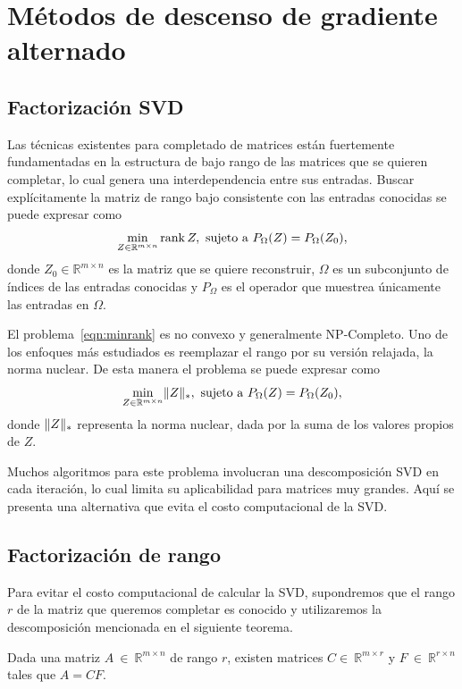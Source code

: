 \section{Métodos de descenso de gradiente alternado}

\subsection{Factorización SVD}
Las técnicas existentes para completado de matrices están fuertemente fundamentadas en la estructura de bajo rango de las matrices que se quieren completar, lo cual genera una interdependencia entre sus entradas. Buscar explícitamente la matriz de rango bajo consistente con las entradas conocidas se puede expresar como
\begin{equation}
    \min_{Z \in \mathbb{R}^{m \times n}} \rank Z, \ \text{sujeto a} \ P_{\Omega}(Z) = P_{\Omega}(Z_0),
    \label{eqn:minrank}
\end{equation}
donde $Z_0 \in \mathbb{R}^{m \times n}$ es la matriz que se quiere reconstruir, $\Omega$ es un subconjunto de índices de las entradas conocidas y $P_{\Omega}$ es el operador que muestrea únicamente las entradas en $\Omega$.

El problema~\ref{eqn:minrank} es no convexo y generalmente NP-Completo. Uno de los enfoques más estudiados es reemplazar el rango por su versión relajada, la norma nuclear. De esta manera el problema se puede expresar como
\begin{equation}
    \min_{Z \in \mathbb{R}^{m \times n}} \lVert Z\rVert_*, \ \text{sujeto a} \ P_{\Omega}(Z) = P_{\Omega}(Z_0),
    \label{eqn:minnuclear}
\end{equation}
donde $\lVert Z\rVert_*$ representa la norma nuclear, dada por la suma de los valores propios de $Z$.

Muchos algoritmos para este problema involucran una descomposición SVD en cada iteración, lo cual limita su aplicabilidad para matrices muy grandes. Aquí se presenta una alternativa que evita el costo computacional de la SVD.

\subsection{Factorización de rango}
Para evitar el costo computacional de calcular la SVD, supondremos que el rango $r$ de la matriz que queremos completar es conocido y utilizaremos la descomposición mencionada en el siguiente teorema.

\begin{teorema}
    Dada una matriz $A~\in~\mathbb{R}^{m \times n}$ de rango $r$, existen matrices $C \in~\mathbb{R}^{m \times r}$ y $F~\in~\mathbb{R}^{r \times n}$ tales que $A = CF$.
\end{teorema}

